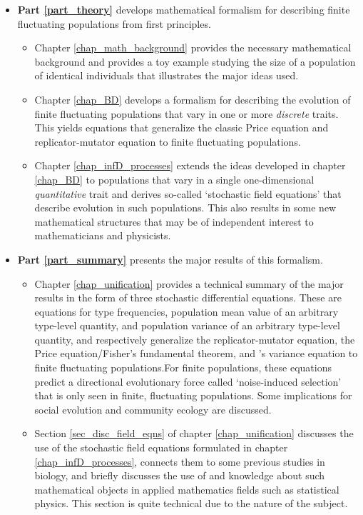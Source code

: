 \begin{itemize}
	\item \textbf{Part \ref{part_theory}}
	develops mathematical formalism for describing finite fluctuating populations from first principles.
		\begin{itemize}
		\item Chapter \ref{chap_math_background} provides the necessary mathematical background and provides a toy example studying the size of a population of identical individuals that illustrates the major ideas used.
		\item Chapter \ref{chap_BD} develops a formalism for describing the evolution of finite fluctuating populations that vary in one or more \emph{discrete} traits. This yields equations that generalize the classic Price equation and replicator-mutator equation to finite fluctuating populations.
		\item Chapter \ref{chap_infD_processes} extends the ideas developed in chapter \ref{chap_BD} to populations that vary in a single one-dimensional \emph{quantitative} trait and derives so-called `stochastic field equations' that describe evolution in such populations. This also results in some new mathematical structures that may be of independent interest to mathematicians and physicists.
		\end{itemize}
	\item \textbf{Part \ref{part_summary}} presents the major results of this formalism.
		\begin{itemize}
			\item Chapter \ref{chap_unification} provides a technical summary of the major results in the form of three stochastic differential equations. These are equations for type frequencies, population mean value of an arbitrary type-level quantity, and population variance of an arbitrary type-level quantity, and respectively generalize the replicator-mutator equation, the Price equation/Fisher's fundamental theorem, and \cite{lion_theoretical_2018}'s variance equation to finite fluctuating populations.For finite populations, these equations predict a directional evolutionary force called `noise-induced selection' that is only seen in finite, fluctuating populations. Some implications for social evolution and community ecology are discussed.
			\item Section \ref{sec_disc_field_eqns} of chapter \ref{chap_unification} discusses the use of the stochastic field equations formulated in chapter \ref{chap_infD_processes}, connects them to some previous studies in biology, and briefly discusses the use of and knowledge about such mathematical objects in applied mathematics fields such as statistical physics. This section is quite technical due to the nature of the subject.

\end{itemize}
\end{itemize}
